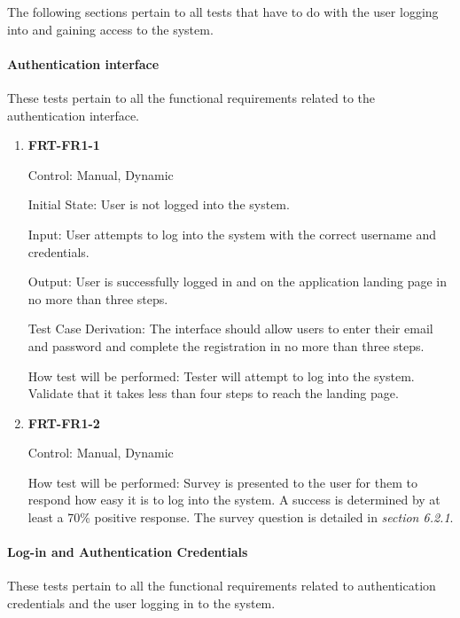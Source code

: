 \documentclass[12pt, titlepage]{article}
\begin{document}
The following sections pertain to all tests that have to do with the user logging into and gaining access to the system.

\paragraph{Authentication interface}

These tests pertain to all the functional requirements related to the authentication interface.

\begin{enumerate}

\item{\textbf{FRT-FR1-1}}

Control: Manual, Dynamic
          
Initial State: User is not logged into the system.
          
Input: User attempts to log into the system with the correct username and credentials.

Output: User is successfully logged in and on the application landing page in no more than three steps.

Test Case Derivation: The interface should allow users to enter their email and password and complete the registration in no more than three steps.
          
How test will be performed: Tester will attempt to log into the system. Validate that it takes less than four steps to reach the landing page.

\item{\textbf{FRT-FR1-2}}

Control: Manual, Dynamic
          
How test will be performed: Survey is presented to the user for them to respond how easy it is to log into the system. A success is determined by at least a 70\% positive response. The survey question is detailed in \textit{section 6.2.1}.

\end{enumerate}


\paragraph{Log-in and Authentication Credentials}

These tests pertain to all the functional requirements related to authentication credentials and the user logging in to the system.
\end{document}
